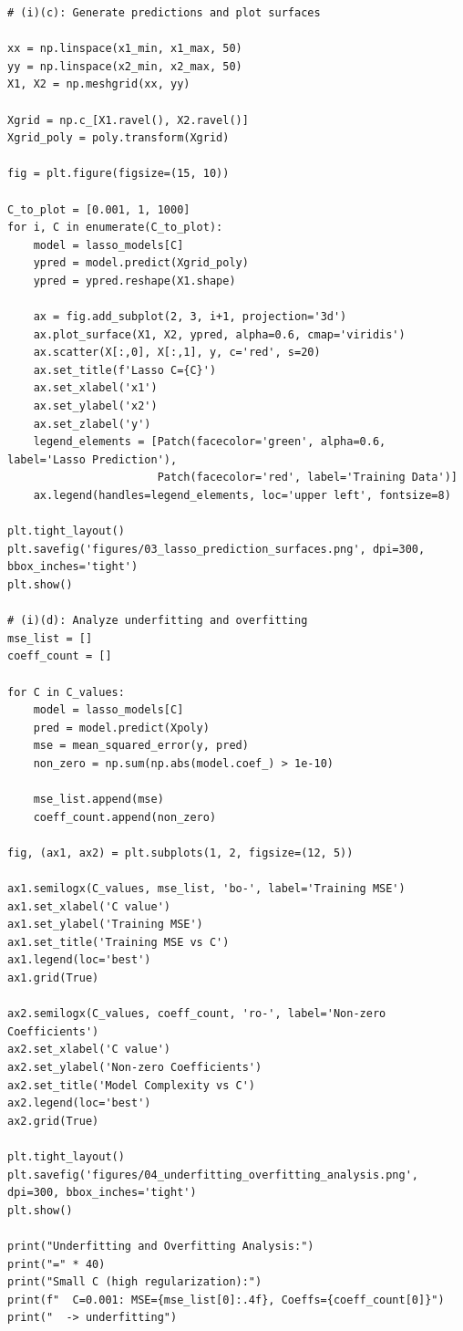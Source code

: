 \documentclass[11pt,a4paper]{article}
\begin{document}
\begin{lstlisting}
# (i)(c): Generate predictions and plot surfaces

xx = np.linspace(x1_min, x1_max, 50)
yy = np.linspace(x2_min, x2_max, 50)
X1, X2 = np.meshgrid(xx, yy)

Xgrid = np.c_[X1.ravel(), X2.ravel()]
Xgrid_poly = poly.transform(Xgrid)

fig = plt.figure(figsize=(15, 10))

C_to_plot = [0.001, 1, 1000]
for i, C in enumerate(C_to_plot):
    model = lasso_models[C]
    ypred = model.predict(Xgrid_poly)
    ypred = ypred.reshape(X1.shape)
    
    ax = fig.add_subplot(2, 3, i+1, projection='3d')
    ax.plot_surface(X1, X2, ypred, alpha=0.6, cmap='viridis')
    ax.scatter(X[:,0], X[:,1], y, c='red', s=20)
    ax.set_title(f'Lasso C={C}')
    ax.set_xlabel('x1')
    ax.set_ylabel('x2')
    ax.set_zlabel('y')
    legend_elements = [Patch(facecolor='green', alpha=0.6, label='Lasso Prediction'),
                       Patch(facecolor='red', label='Training Data')]
    ax.legend(handles=legend_elements, loc='upper left', fontsize=8)

plt.tight_layout()
plt.savefig('figures/03_lasso_prediction_surfaces.png', dpi=300, bbox_inches='tight')
plt.show()

# (i)(d): Analyze underfitting and overfitting
mse_list = []
coeff_count = []

for C in C_values:
    model = lasso_models[C]
    pred = model.predict(Xpoly)
    mse = mean_squared_error(y, pred)
    non_zero = np.sum(np.abs(model.coef_) > 1e-10)
    
    mse_list.append(mse)
    coeff_count.append(non_zero)

fig, (ax1, ax2) = plt.subplots(1, 2, figsize=(12, 5))

ax1.semilogx(C_values, mse_list, 'bo-', label='Training MSE')
ax1.set_xlabel('C value')
ax1.set_ylabel('Training MSE')
ax1.set_title('Training MSE vs C')
ax1.legend(loc='best')
ax1.grid(True)

ax2.semilogx(C_values, coeff_count, 'ro-', label='Non-zero Coefficients')
ax2.set_xlabel('C value')
ax2.set_ylabel('Non-zero Coefficients')
ax2.set_title('Model Complexity vs C')
ax2.legend(loc='best')
ax2.grid(True)

plt.tight_layout()
plt.savefig('figures/04_underfitting_overfitting_analysis.png', dpi=300, bbox_inches='tight')
plt.show()

print("Underfitting and Overfitting Analysis:")
print("=" * 40)
print("Small C (high regularization):")
print(f"  C=0.001: MSE={mse_list[0]:.4f}, Coeffs={coeff_count[0]}")
print("  -> underfitting")


\end{lstlisting}
\end{document}
